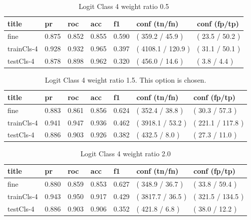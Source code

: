 \documentclass[ms]{nuthesis}
\begin{document}
\FloatBarrier
\begin{table}[H]
\centering
\caption{Logit Class 4 weight ratio 0.5}
\label{tab:LogRegCls4-Wtp5}
\begin{tabular}{|l||l||l||l||l||l||l|}\toprule
title & pr & roc & acc & f1 & conf (tn/fn) & conf (fp/tp) \\ \midrule
fine & 0.875 & 0.852 & 0.855 & 0.590 & ( 359.2 / 45.9 ) & ( 23.5 / 50.2 ) \\
trainCls-4 & 0.928 & 0.932 & 0.965 & 0.397 & ( 4108.1 / 120.9 ) & ( 31.1 / 50.1 ) \\
testCls-4 & 0.878 & 0.898 & 0.962 & 0.320 & ( 456.0 / 14.6 ) & ( 3.8 / 4.4 ) \\ \bottomrule
\end{tabular}
\end{table}
\FloatBarrier


\FloatBarrier
\begin{table}[H]
\centering
\caption{Logit Class 4 weight ratio 1.5. This option is chosen.}
\label{tab:LogRegCls4-Wt1p5}
\begin{tabular}{|l||l||l||l||l||l||l|}\toprule
title & pr & roc & acc & f1 & conf (tn/fn) & conf (fp/tp) \\ \midrule
fine & 0.883 & 0.861 & 0.856 & 0.624 & ( 352.4 / 38.8 ) & ( 30.3 / 57.3 ) \\
trainCls-4 & 0.941 & 0.947 & 0.936 & 0.462 & ( 3918.1 / 53.2 ) & ( 221.1 / 117.8 ) \\
testCls-4 & 0.886 & 0.903 & 0.926 & 0.382 & ( 432.5 / 8.0 ) & ( 27.3 / 11.0 ) \\ \bottomrule
\end{tabular}
\end{table}
\FloatBarrier

\FloatBarrier
\begin{table}[H]
\centering
\caption{Logit Class 4 weight ratio 2.0}
\label{tab:LogRegCls4-Wt2}
\begin{tabular}{|l||l||l||l||l||l||l|}\toprule
title & pr & roc & acc & f1 & conf (tn/fn) & conf (fp/tp) \\ \midrule
fine & 0.880 & 0.859 & 0.853 & 0.627 & ( 348.9 / 36.7 ) & ( 33.8 / 59.4 ) \\
trainCls-4 & 0.943 & 0.950 & 0.917 & 0.429 & ( 3817.7 / 36.5 ) & ( 321.5 / 134.5 ) \\
testCls-4 & 0.886 & 0.903 & 0.906 & 0.352 & ( 421.8 / 6.8 ) & ( 38.0 / 12.2 ) \\ \bottomrule
\end{tabular}
\end{table}
\FloatBarrier
\end{document}
